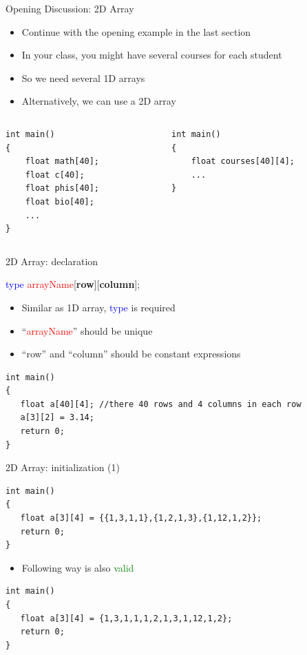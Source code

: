 \begin{frame}[fragile]{Opening Discussion: 2D Array}
	\begin{itemize}
		\item {Continue with the opening example in the last section}
		\item {In your class, you might have several courses for each student}
		\item {So we need several 1D arrays}
		\item {Alternatively, we can use a 2D array}
	\end{itemize}
\begin{columns}
\begin{column}{0.4\linewidth}
\begin{lstlisting}
int main()
{
    float math[40];
    float c[40];
    float phis[40];
    float bio[40];
    ...
}
\end{lstlisting}
\end{column}
\begin{column}{0.4\linewidth}
\begin{lstlisting}
int main()
{
    float courses[40][4];
    ...
}
\end{lstlisting}
\end{column}
\end{columns}
\end{frame}

\begin{frame}[fragile]{2D Array: declaration}
\begin{center}
	\LARGE{
	 \textcolor{blue}{type} \textcolor{red}{arrayName}[\textbf{row}][\textbf{column}];
	}
\end{center}

	\begin{itemize}
		\item {Similar as 1D array, \textcolor{blue}{type} is required}
		\item {``\textcolor{red}{arrayName}'' should be unique}
		\item {``row'' and ``column'' should be constant expressions}
	\end{itemize}
\begin{lstlisting}
int main()
{
   float a[40][4]; //there 40 rows and 4 columns in each row
   a[3][2] = 3.14;
   return 0;
}
\end{lstlisting}
\end{frame}

\begin{frame}[fragile]{2D Array: initialization (1)}
\begin{lstlisting}
int main()
{
   float a[3][4] = {{1,3,1,1},{1,2,1,3},{1,12,1,2}};
   return 0;
}
\end{lstlisting}
\begin{itemize}
	\item {Following way is also \textcolor{green}{valid}}
\end{itemize}
\begin{lstlisting}
int main()
{
   float a[3][4] = {1,3,1,1,1,2,1,3,1,12,1,2};
   return 0;
}
\end{lstlisting}
\end{frame}

